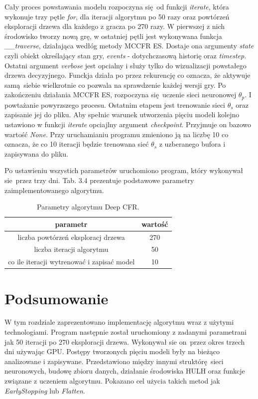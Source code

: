 \documentclass[12pt,oneside,a4paper]{report}
\begin{document}
Cały proces powstawania modelu rozpoczyna się od funkcji \emph{iterate}, która wykonuje trzy pętle
\emph{for},
dla iteracji algorytmu po 50 razy oraz powtórzeń eksploracji drzewa dla każdego z gracza po 270 razy. W pierwszej z nich 
środowisko tworzy nową grę, w ostatniej pętli jest wykonywana funkcja \emph{\_\_traverse},
działająca wedłóg metody MCCFR ES. Dostaje ona argumenty \emph{state} czyli obiekt określający
stan gry, \emph{events} - dotychczasową historię oraz \emph{timestep}.
Ostatni argument \emph{verbose} jest opcialny i służy tylko do wizualizacji powstałego drzewa
decyzyjnego. Funckja działa po przez rekurencję co oznacza, że aktywuje samą siebie wielkrotnie co
pozwala na sprawdzenie każdej wersji gry.
Po zakończeniu działania MCCFR ES, rozpoczyna się uczenie sieci neuronowej $\theta_{p}$. I
powtażanie powyrzszego procesu. 
Ostatnim etapem jest trenowanie sieci $\theta_{s}$ oraz zapisanie jej do pliku. Aby spełnic warunek 
utworzenia pięciu modeli kolejno ustawiono w funkcji \emph{iterate} opciajlny argument
\emph{checkpoint}. Przyjmuje on bazowo wartość \emph{None}. Przy uruchamianiu programu zmieniono 
ją na liczbę 10 co oznacza, że co 10 iteracji będzie trenowana sieć $\theta_{s}$ z uzberanego bufora
i zapisywana do pliku. 

Po ustawieniu wszystich parametrów uruchomiono program, który wykonywał sie przez trzy dni.
Tab. 3.4 prezentuje podstawowe parametry zaimplementowanego algorytmu.


\begin{table}[h!]
\centering
\caption{Parametry algorytmu Deep CFR.}
\begin{tabular}{|c|c| }
   \hline
   parametr & wartość \\
    \hline
   liczba powtórzeń eksploracj drzewa & 270  \\ 
   \hline
   liczba iteracji algorytmu & 50  \\  
   \hline
   co ile iteracji wytrenować i zapisać model & 10 \\
   \hline
\end{tabular}
\end{table}



\section{Podsumowanie}


W tym rozdziale zaprezentowano implementację algorytmu wraz z użytymi technologiami. Program
następnie został uruchomiony  z zadanymi parametrani jak 50 iteracji po 270 eksploracji drzewa.
Wykonywał sie on przez okres trzech dni używając GPU. Postępy
tworzonych pięciu modeli były na bieżąco analizowane i zapisywane. Przedstawiono między innymi struktórę sieci
neuronowych, budowę zbioru danych, działanie środowiska HULH oraz funkcje związane z uczeniem
algorytmu. Pokazano cel użycia takich metod jak \emph{EarlyStopping} lub \emph{Flatten}. 
\end{document}
